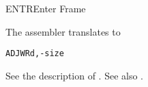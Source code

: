 \begin{instruction}{ENTR}{Enter Frame}
  \begin{remarks}
The assembler translates \texttt{\mnemonic} to
\begin{alltt}
  ADJW Rd, -size
\end{alltt}

See the description of . See also .
  \end{remarks}
\end{instruction}

